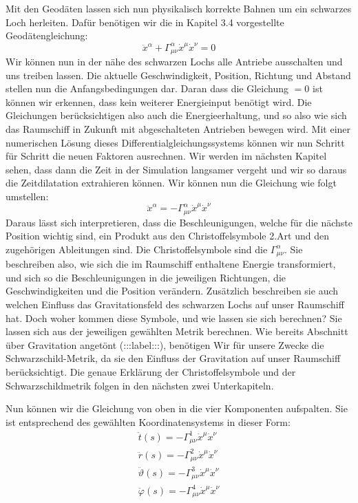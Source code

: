 \begin{refsection}
	Mit den Geodäten lassen sich nun physikalisch korrekte Bahnen um ein schwarzes Loch herleiten. Dafür benötigen wir die in Kapitel 3.4 vorgestellte Geodätengleichung:	
	\begin{equation}
	\ddot{x}^{\alpha} + \Gamma^{\alpha}_{\mu\nu}\dot{x}^{\mu}\dot{x}^{\nu} = 0
	\end{equation}	
	Wir können nun in der nähe des schwarzen Lochs alle Antriebe ausschalten und uns treiben lassen. Die aktuelle Geschwindigkeit, Position, Richtung und Abstand stellen nun die Anfangsbedingungen dar. Daran dass die Gleichung $=0$ ist können wir erkennen, dass kein weiterer Energieinput benötigt wird. Die Gleichungen berücksichtigen also auch die Energieerhaltung, und so also wie sich das Raumschiff in Zukunft mit abgeschalteten Antrieben bewegen wird. Mit einer numerischen Lösung dieses Differentialgleichungssystems können wir nun Schritt für Schritt die neuen Faktoren ausrechnen. Wir werden im nächsten Kapitel sehen, dass dann die Zeit in der Simulation langsamer vergeht und wir so daraus die Zeitdilatation extrahieren können.
	Wir k\"onnen nun die Gleichung wie folgt umstellen:	
	\begin{equation}
	\ddot{x}^{\alpha} = -\Gamma^{\alpha}_{\mu\nu}\dot{x}^{\mu}\dot{x}^{\nu}
	\end{equation}
	Daraus lässt sich interpretieren, dass die Beschleunigungen, welche für die nächste Position wichtig sind, ein Produkt aus den Christoffelsymbole 2.Art und den zugehörigen Ableitungen sind. Die Christoffelsymbole sind die $\Gamma^{\alpha}_{\mu\nu}$. Sie beschreiben also, wie sich die im Raumschiff enthaltene Energie transformiert, und sich so die Beschleunigungen in die jeweiligen Richtungen, die Geschwindigkeiten und die Position verändern. Zusätzlich beschreiben sie auch welchen Einfluss das Gravitationsfeld des schwarzen Lochs auf unser Raumschiff hat.
	Doch woher kommen diese Symbole, und wie lassen sie sich berechnen?
	Sie lassen sich aus der jeweiligen gewählten Metrik berechnen. Wie bereits Abschnitt über Gravitation angetönt (:::label:::), benötigen Wir für unsere Zwecke die Schwarzschild-Metrik, da sie den Einfluss der Gravitation auf unser Raumschiff berücksichtigt. Die genaue Erklärung der Christoffelsymbole und der Schwarzschildmetrik folgen in den nächsten zwei Unterkapiteln.
	
	Nun können wir die Gleichung von oben in die vier Komponenten aufspalten.
	Sie ist entsprechend des gewählten Koordinatensystems in dieser Form:
	\begin{align*}
	\ddot{t}(s) = -\Gamma^{1}_{\mu\nu}\dot{x}^{\mu}\dot{x}^{\nu}\\
	\ddot{r}(s) = -\Gamma^{2}_{\mu\nu}\dot{x}^{\mu}\dot{x}^{\nu}\\
	\ddot{\vartheta}(s) = -\Gamma^{3}_{\mu\nu}\dot{x}^{\mu}\dot{x}^{\nu}\\
	\ddot{\varphi}(s) = -\Gamma^{4}_{\mu\nu}\dot{x}^{\mu}\dot{x}^{\nu}		
	\end{align*}
	

\end{refsection}
